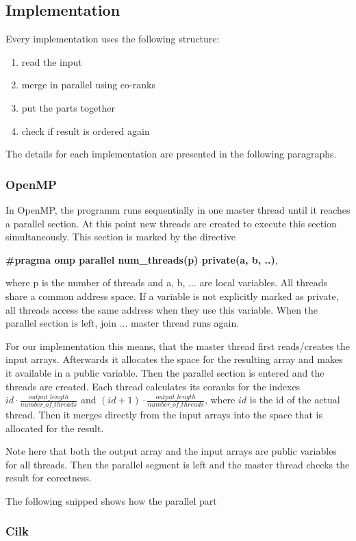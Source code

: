 \subsection{Implementation}
Every implementation uses the following structure:
\begin{enumerate}
  \item read the input
  \item merge in parallel using co-ranks
  \item put the parts together
  \item check if result is ordered again
\end{enumerate}
The details for each implementation are presented in the following paragraphs.

\subsubsection{OpenMP}
In OpenMP, the programm runs sequentially in one master thread until it reaches a parallel section.
At this point new threads are created to execute this section simultaneously.
This section is marked by the directive

\textbf{\#pragma omp parallel num\_threads(p) private(a, b, ..)},

where p is the number of threads and a, b, ... are local variables.
All threads share a common address space.
If a variable is not explicitly marked as private, all threads access the same address when they use this variable.
When the parallel section is left, join ... master thread runs again.

For our implementation this means, that the master thread first reads/creates the input arrays.
Afterwards it allocates the space for the resulting array and makes it available in a public variable.
Then the parallel section is entered and the threads are created.
Each thread calculates its coranks for the indexes
$id \cdot \frac{output\_length}{number\_of\_threads}$
and
$(id+1)\cdot \frac{output\_length}{number\_of\_threads}$, where $id$ is the id of the actual thread.
Then it merges directly from the input arrays into the space that is allocated for the result.

Note here that both the output array and the input arrays are public variables for all threads.
Then the parallel segment is left and the master thread checks the result for corectness.

The following snipped shows how the parallel part


\subsubsection{Cilk}

